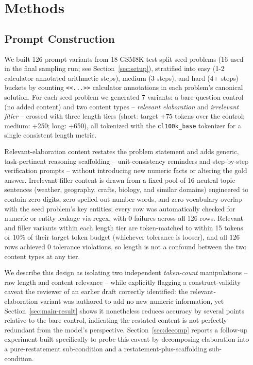 \documentclass[11pt,letterpaper]{article}
\begin{document}
\section{Methods}

\subsection{Prompt Construction}
\label{sec:prompt-construction}

We built 126 prompt variants from 18 GSM8K \citep{Cobbe2021} test-split seed problems (16 used in the final sampling run; see Section~\ref{sec:setup}), stratified into easy (1-2 calculator-annotated arithmetic steps), medium (3 steps), and hard (4+ steps) buckets by counting \texttt{<<...>>} calculator annotations in each problem's canonical solution. For each seed problem we generated 7 variants: a bare-question control (no added content) and two content types -- \emph{relevant elaboration} and \emph{irrelevant filler} -- crossed with three length tiers (short: target +75 tokens over the control; medium: +250; long: +650), all tokenized with the \texttt{cl100k\_base} tokenizer for a single consistent length metric.

Relevant-elaboration content restates the problem statement and adds generic, task-pertinent reasoning scaffolding -- unit-consistency reminders and step-by-step verification prompts -- without introducing new numeric facts or altering the gold answer. Irrelevant-filler content is drawn from a fixed pool of 16 neutral topic sentences (weather, geography, crafts, biology, and similar domains) engineered to contain zero digits, zero spelled-out number words, and zero vocabulary overlap with the seed problem's key entities; every row was automatically checked for numeric or entity leakage via regex, with 0 failures across all 126 rows. Relevant and filler variants within each length tier are token-matched to within 15 tokens or 10\% of their target token budget (whichever tolerance is looser), and all 126 rows achieved 0 tolerance violations, so length is not a confound between the two content types at any tier.

We describe this design as isolating two independent \emph{token-count} manipulations -- raw length and content relevance -- while explicitly flagging a construct-validity caveat the reviewer of an earlier draft correctly identified: the relevant-elaboration variant was authored to add no new numeric information, yet Section~\ref{sec:main-result} shows it nonetheless reduces accuracy by several points relative to the bare control, indicating the restated content is not perfectly redundant from the model's perspective. Section~\ref{sec:decomp} reports a follow-up experiment built specifically to probe this caveat by decomposing elaboration into a pure-restatement sub-condition and a restatement-plus-scaffolding sub-condition.
\end{document}
